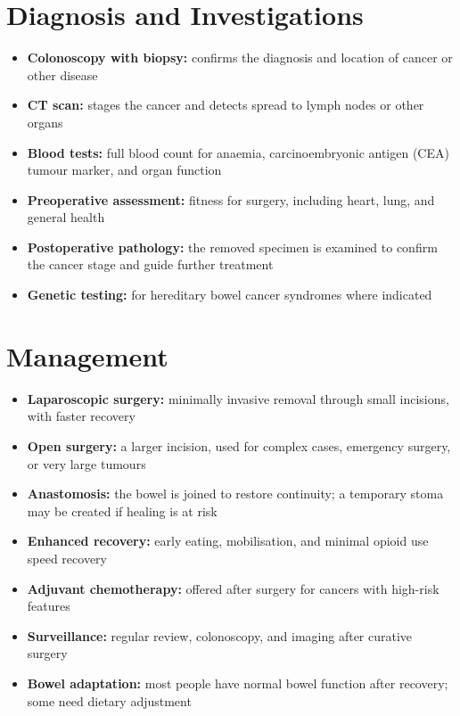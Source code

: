 \section*{Diagnosis and Investigations}
\begin{itemize}
    \item \textbf{Colonoscopy with biopsy:} confirms the diagnosis and location of cancer or other disease
    \item \textbf{CT scan:} stages the cancer and detects spread to lymph nodes or other organs
    \item \textbf{Blood tests:} full blood count for anaemia, carcinoembryonic antigen (CEA) tumour marker, and organ function
    \item \textbf{Preoperative assessment:} fitness for surgery, including heart, lung, and general health
    \item \textbf{Postoperative pathology:} the removed specimen is examined to confirm the cancer stage and guide further treatment
    \item \textbf{Genetic testing:} for hereditary bowel cancer syndromes where indicated
\end{itemize}

\section*{Management}
\begin{itemize}
    \item \textbf{Laparoscopic surgery:} minimally invasive removal through small incisions, with faster recovery
    \item \textbf{Open surgery:} a larger incision, used for complex cases, emergency surgery, or very large tumours
    \item \textbf{Anastomosis:} the bowel is joined to restore continuity; a temporary stoma may be created if healing is at risk
    \item \textbf{Enhanced recovery:} early eating, mobilisation, and minimal opioid use speed recovery
    \item \textbf{Adjuvant chemotherapy:} offered after surgery for cancers with high-risk features
    \item \textbf{Surveillance:} regular review, colonoscopy, and imaging after curative surgery
    \item \textbf{Bowel adaptation:} most people have normal bowel function after recovery; some need dietary adjustment
\end{itemize}

